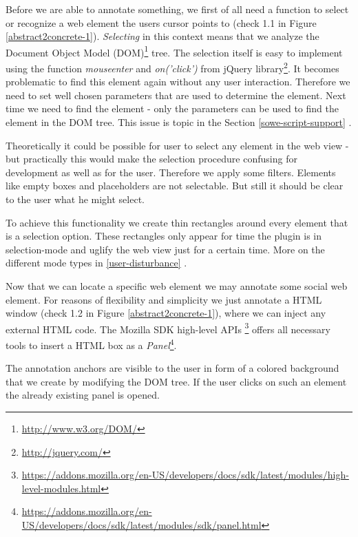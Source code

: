 Before we are able to annotate something, we first of all need a function to select or recognize a web element the users cursor points to (check 1.1 in Figure \ref{abstract2concrete-1}). \emph{Selecting} in this context means that we analyze the Document Object Model (DOM)\footnote{\url{http://www.w3.org/DOM/}} tree. The selection itself is easy to implement using the function \emph{mouseenter} and \emph{on('click')} from jQuery library\footnote{\url{http://jquery.com/}}. It becomes problematic to find this element again without any user interaction. Therefore we need to set well chosen parameters that are used to determine the element. Next time we need to find the element - only the parameters can be used to find the element in the DOM tree. This issue is topic in the Section \ref{sowe-script-support} .

Theoretically it could be possible for user to select any element in the web view - but practically this would make the selection procedure confusing for development as well as for the user. Therefore we apply some filters. Elements like empty boxes and placeholders are not selectable. 
But still it should be clear to the user what he might select. 

To achieve this functionality we create thin rectangles around every element that is a selection option. These rectangles only appear for time the plugin is in selection-mode and uglify the web view just for a certain time. More on the different mode types in \ref{user-disturbance}  .

Now that we can locate a specific web element we may annotate some social web element. For reasons of flexibility and simplicity we just annotate a HTML window (check 1.2 in Figure \ref{abstract2concrete-1}), where we can inject any external HTML code. The Mozilla SDK high-level APIs \footnote{\url{https://addons.mozilla.org/en-US/developers/docs/sdk/latest/modules/high-level-modules.html}} offers all necessary tools to insert a HTML box as a \emph{Panel}\footnote{\url{https://addons.mozilla.org/en-US/developers/docs/sdk/latest/modules/sdk/panel.html}}.

The annotation anchors are visible to the user in form of a colored background that we create by modifying the DOM tree.
If the user clicks on such an element the already existing panel is opened. 

